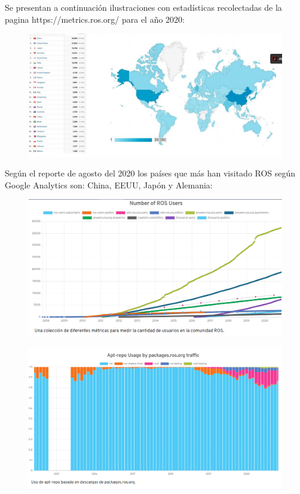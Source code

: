         Se presentan a continuación ilustraciones con estadísticas recolectadas de la pagina https://metrics.ros.org/ para el año 2020:
        
        \begin{figure}[htb]
            \centering
            \includegraphics[width=0.8\linewidth]{Main/Chapter3/Images3/cap3_estadisticas_7.png}
            \caption{}
            \label{f:Cap3-5_estadisticas_4}
        \end{figure}  
        
        Según el reporte de agosto del 2020 los países que más han visitado ROS según Google Analytics son: China, EEUU, Japón y Alemania:
        
        \begin{figure}[htb]
            \centering
            \includegraphics[width=0.8\linewidth]{Main/Chapter3/Images3/cap3_estadisticas_4.png}
            \caption{}
            \label{f:Cap3-5_estadisticas_5}
        \end{figure}  
        
        \newpage


        \begin{figure}[htb]
            \centering
            \includegraphics[width=0.5\linewidth]{Main/Chapter3/Images3/cap3_estadisticas_5.png}
            \caption{}
            \label{f:Cap3-5_estadisticas_6}
        \end{figure}  


